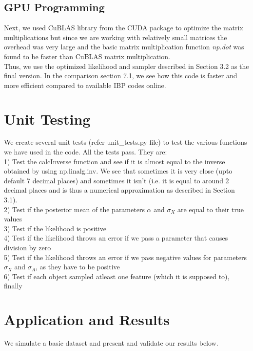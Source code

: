 \documentclass[11pt]{article}
\begin{document}
\subsection{GPU Programming}
Next, we used CuBLAS library from the CUDA package to optimize the matrix multiplications but since we are working with relatively small matrices the overhead was very large and the basic matrix multiplication function \textit{np.dot} was found to be faster than CuBLAS matrix multiplication.\\

Thus, we use the optimized likelihood and sampler described in Section 3.2 as the final version. In the comparison section 7.1, we see how this code is faster and more efficient compared to available IBP codes online.

\section{Unit Testing}
We create several unit tests (refer unit\_tests.py file) to test the various functions we have used in the code. All the tests pass. They are:\\

1) Test the calcInverse function and see if it is almost equal to the inverse obtained by using np.linalg.inv. We see that sometimes it is very close (upto default 7 decimal places) and sometimes it isn't (i.e. it is equal to around 2 decimal places and is thus a numerical approximation as described in Section 3.1).\\

2) Test if the posterior mean of the parameters $\alpha$ and $\sigma_{X}$ are equal to their true values\\

3) Test if the likelihood is positive\\

4) Test if the likelihood throws an error if we pass a parameter that causes division by zero\\

5) Test if the likelihood throws an error if we pass negative values for parameters $\sigma_{X}$ and $\sigma_{A}$, as they have to be positive\\

6) Test if each object sampled atleast one feature (which it is supposed to), finally

\section{Application and Results}
We simulate a basic dataset and present and validate our results below.
\end{document}
